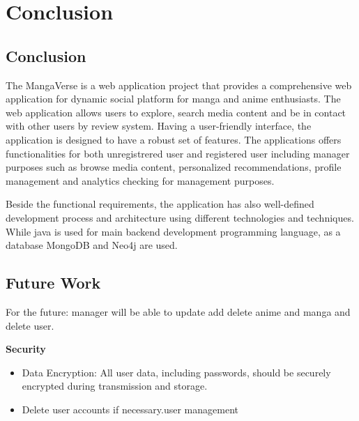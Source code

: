 \chapter{Conclusion}

\section{Conclusion}
The MangaVerse is a web application project that provides a comprehensive web application for 
dynamic social platform for manga and anime enthusiasts. The web application allows users to explore, search media content
and be in contact with other users by review system. Having a user-friendly interface, the application is designed to have a robust set of features.
The applications offers functionalities for both unregistrered user and registered user including manager purposes such as browse 
media content, personalized recommendations, profile management and analytics checking for management purposes.

Beside the functional requirements, the application has also well-defined development process and architecture using 
different technologies and techniques. While java is used for main backend development programming language, as a database MongoDB and
Neo4j are used. 


\section{Future Work}
For the future: manager will be able to update add delete anime and manga and delete user.

\textbf{Security}

\begin{itemize}
    \item Data Encryption: All user data, including passwords, should be securely encrypted during transmission and storage.
    \item Delete user accounts if necessary.user management
\end{itemize}
